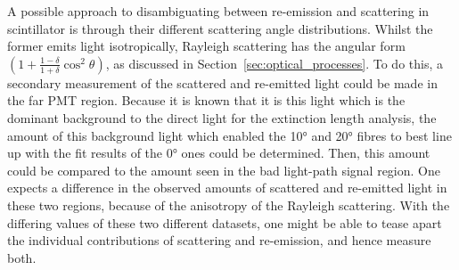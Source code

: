 A possible approach to disambiguating between re-emission and scattering in scintillator is through their different scattering angle distributions. Whilst the former emits light isotropically, Rayleigh scattering has the angular form $\left(1+\frac{1-\delta}{1+\delta}\cos^{2}\theta\right)$, as discussed in Section~\ref{sec:optical_processes}. To do this, a secondary measurement of the scattered and re-emitted light could be made in the far PMT region. Because it is known that it is this light which is the dominant background to the direct light for the extinction length analysis, the amount of this background light which enabled the \ang{10} and \ang{20} fibres to best line up with the fit results of the \ang{0} ones could be determined. Then, this amount could be compared to the amount seen in the bad light-path signal region. One expects a difference in the observed amounts of scattered and re-emitted light in these two regions, because of the anisotropy of the Rayleigh scattering. With the differing values of these two different datasets, one might be able to tease apart the individual contributions of scattering and re-emission, and hence measure both.


